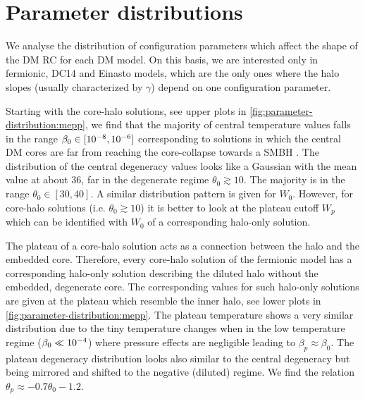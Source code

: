\section{Parameter distributions}
\label{sec:appendix:parameter-distribution}

We analyse the distribution of configuration parameters which affect the shape of the DM RC for each DM model. On this basis, we are interested only in fermionic, DC14 and Einasto models, which are the only ones where the halo slopes (usually characterized by $\gamma$) depend on one configuration parameter.


Starting with the core-halo solutions, see upper plots in \cref{fig:parameter-distribution:mepp}, we find that the majority of central temperature values falls in the range $\beta_0 \in [\num{E-8}, \num{E-6}]$ corresponding to solutions in which the central DM cores are far from reaching the core-collapse towards a SMBH \citep{2019PDU....24..278A,2021MNRAS.502.4227A}. The distribution of the central degeneracy values looks like a Gaussian with the mean value at about 36, far in the degenerate regime $\theta_0 \gtrsim 10$. The majority is in the range $\theta_0 \in [30, 40]$. A similar distribution pattern is given for $W_0$. However, for core-halo solutions (i.e. $\theta_0 \gtrsim 10$) it is better to look at the plateau cutoff $W_p$ which can be identified with $W_0$ of a corresponding halo-only solution.

The plateau of a core-halo solution acts as a connection between the halo and the embedded core. Therefore, every core-halo solution of the fermionic model has a corresponding halo-only solution describing the diluted halo without the embedded, degenerate core. The corresponding values for such halo-only solutions are given at the plateau which resemble the inner halo, see lower plots in \cref{fig:parameter-distribution:mepp}. The plateau temperature shows a very similar distribution due to the tiny temperature changes when in the low temperature regime ($\beta_0 \ll \num{E-4}$) where pressure effects are negligible leading to $\beta_p \approx \beta_0$. The plateau degeneracy distribution looks also similar to the central degeneracy but being mirrored and shifted to the negative (diluted) regime. We find the relation $\theta_p \approx -0.7 \theta_0 - 1.2$.

